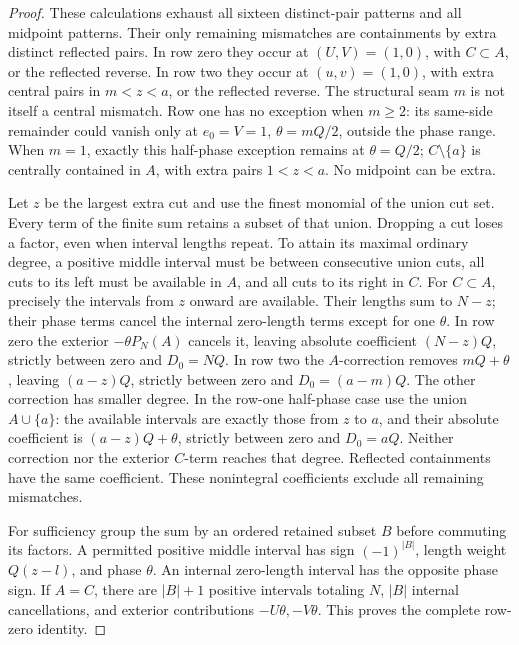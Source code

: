 \documentclass[11pt,a4paper]{amsart}
\numberwithin{equation}{section}
\theoremstyle{plain}
\theoremstyle{definition}
\begin{document}
\begin{proof}
These calculations exhaust all sixteen distinct-pair patterns and all
midpoint patterns.  Their only remaining mismatches are containments by
extra distinct reflected pairs.  In row zero they occur at
\((U,V)=(1,0)\), with \(C\subset A\), or the reflected reverse.
In row two they occur at \((u,v)=(1,0)\), with extra central pairs in
\(m<z<a\), or the reflected reverse.  The structural seam \(m\) is not
itself a central mismatch.  Row one has no exception when \(m\ge2\):
its same-side remainder could vanish only at
\(e_0=V=1\), \(\theta=mQ/2\), outside the phase range.
When \(m=1\), exactly this half-phase exception remains at \(\theta=Q/2\);
\(C\setminus\{a\}\) is centrally contained in \(A\), with extra pairs
\(1<z<a\).  No midpoint can be extra.

Let \(z\) be the largest extra cut and use the finest monomial of the union
cut set.  Every term of the finite sum retains a subset of that union.
Dropping a cut loses a factor, even when interval lengths repeat.  To attain
its maximal ordinary degree, a positive middle interval must be between
consecutive union cuts, all cuts to its left must be available in \(A\),
and all cuts to its right in \(C\).  For \(C\subset A\), precisely the
intervals from \(z\) onward are available.  Their lengths sum to \(N-z\);
their phase terms cancel the internal zero-length terms except for one
\(\theta\).  In row zero the exterior \(-\theta P_N(A)\) cancels it,
leaving absolute coefficient \((N-z)Q\), strictly between zero and
\(D_0=NQ\).  In row two the \(A\)-correction removes \(mQ+\theta\),
leaving \((a-z)Q\), strictly between zero and \(D_0=(a-m)Q\).
The other correction has smaller degree.  In the row-one half-phase case
use the union \(A\cup\{a\}\): the available intervals are exactly those
from \(z\) to \(a\), and their absolute coefficient is
\((a-z)Q+\theta\), strictly between zero and \(D_0=aQ\).
Neither correction nor the exterior \(C\)-term reaches that degree.
Reflected containments have the same coefficient.  These nonintegral
coefficients exclude all remaining mismatches.

For sufficiency group the sum by an ordered retained subset \(B\) before
commuting its factors.  A permitted positive middle interval has sign
\((-1)^{|B|}\), length weight \(Q(z-l)\), and phase \(\theta\).
An internal zero-length interval has the opposite phase sign.  If
\(A=C\), there are \(|B|+1\) positive intervals totaling \(N\),
\(|B|\) internal cancellations, and exterior contributions
\(-U\theta,-V\theta\).  This proves the complete row-zero identity.


\end{proof}
\end{document}
